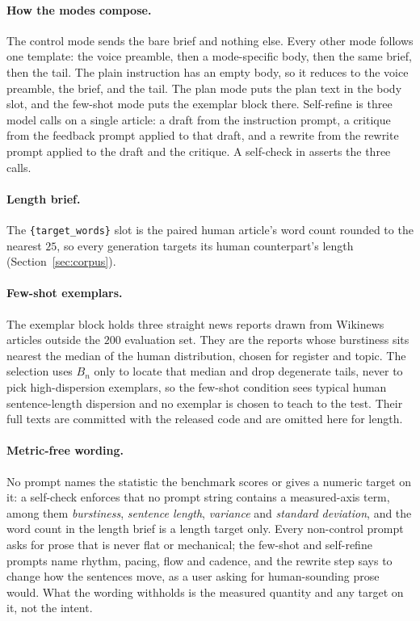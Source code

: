\documentclass{article}
\begin{document}
\paragraph{How the modes compose.} The control mode sends the bare brief and nothing else. Every
other mode follows one template: the voice preamble, then a mode-specific body, then the same
brief, then the tail. The plain instruction has an empty body, so it reduces to the voice
preamble, the brief, and the tail. The plan mode puts the plan text in the body slot, and the
few-shot mode puts the exemplar block there. Self-refine is three model calls on a single
article: a draft from the instruction prompt, a critique from the feedback prompt applied to that
draft, and a rewrite from the rewrite prompt applied to the draft and the critique. A self-check
in  asserts the three calls.

\paragraph{Length brief.} The \texttt{\{target\_words\}} slot is the paired human article's word
count rounded to the nearest $25$, so every generation targets its human counterpart's length
(Section~\ref{sec:corpus}).

\paragraph{Few-shot exemplars.} The exemplar block holds three straight news reports drawn from
Wikinews articles outside the $200$ evaluation set. They are the reports whose burstiness sits
nearest the median of the human distribution, chosen for register and topic. The selection uses
$B_n$ only to locate that median and drop degenerate tails, never to pick high-dispersion
exemplars, so the few-shot condition sees typical human sentence-length dispersion and no exemplar is
chosen to teach to the test. Their full texts are
committed with the released code and are omitted here for length.

\paragraph{Metric-free wording.} No prompt names the statistic the benchmark scores or gives a
numeric target on it: a self-check enforces that no prompt string contains a measured-axis
term, among them \emph{burstiness}, \emph{sentence length}, \emph{variance} and \emph{standard
deviation}, and the word count in the length brief is a length target only. Every non-control
prompt asks for prose that is never flat or mechanical; the few-shot and self-refine prompts name
rhythm, pacing, flow and cadence, and the rewrite step says to change how the sentences move, as
a user asking for human-sounding prose would. What the wording withholds is the measured
quantity and any target on it, not the intent.
\end{document}

